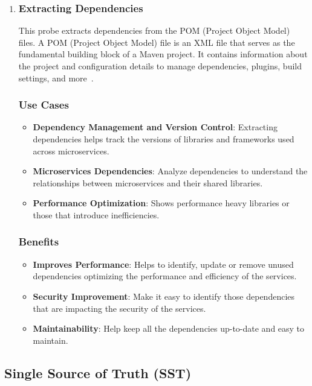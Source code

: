 \begin{enumerate}[leftmargin=*, label=\arabic*.]
    \item \subsubsection*{Extracting Dependencies}
   	This probe extracts dependencies from the POM (Project Object Model) files. A POM (Project Object Model) file is an XML file that serves as the fundamental building block of a Maven project. It contains information about the project and configuration details to manage dependencies, plugins, build settings, and more~\citep{pom_file_guide}.
	\subsubsection{Use Cases}
	\begin{itemize}[label=$\bullet$]
		\item \textbf{Dependency Management and Version Control}: Extracting dependencies helps track the versions of libraries and frameworks used across microservices.
		\item \textbf{Microservices Dependencies}: Analyze dependencies to understand the relationships between microservices and their shared libraries.
		\item \textbf{Performance Optimization}: Shows performance heavy libraries or those that introduce inefficiencies.
	\end{itemize}
	\subsubsection{Benefits}
	\begin{itemize}[label=$\bullet$]
		\item \textbf{Improves Performance}: Helps to identify, update or remove unused dependencies optimizing the performance and efficiency of the services.
		\item \textbf{Security Improvement}: Make it easy to identify those dependencies that are impacting the security of the services.
		\item \textbf{Maintainability}: Help keep all the dependencies up-to-date and easy to maintain.
	\end{itemize} 

\end{enumerate}

\subsection{Single Source of Truth (SST)}\label{subsec:component-sst}

